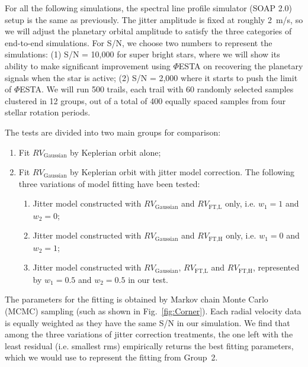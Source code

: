 For all the following simulations, the spectral line profile simulator (SOAP 2.0) setup is the same as previously. The jitter amplitude is fixed at roughly 2~m/s, so we will adjust the planetary orbital amplitude to satisfy the three categories of end-to-end simulations. For S/N, we choose two numbers to represent the simulations: (1) S/N = 10,000 for super bright stars, where we will show its ability to make significant improvement using $\mathit{\Phi}$ESTA on recovering the planetary signals when the star is active; (2) S/N = 2,000 where it starts to push the limit of $\mathit{\Phi}$ESTA. We will run 500 trails, each trail with 60 randomly selected samples clustered in 12 groups, out of a total of 400 equally spaced samples from four stellar rotation periods. 

The tests are divided into two main groups for comparison:
\begin{enumerate}
	\item Fit $RV_\text{Gaussian}$ by Keplerian orbit alone;
	\item Fit $RV_\text{Gaussian}$ by Keplerian orbit with jitter model correction. The following three variations of model fitting have been tested:
   \begin{enumerate}
     \item Jitter model constructed with $RV_\text{Gaussian}$ and $RV_\text{FT,L}$ only, i.e. $w_1=1$ and $w_2=0$;
     \item Jitter model constructed with $RV_\text{Gaussian}$ and $RV_\text{FT,H}$ only, i.e. $w_1=0$ and $w_2=1$;
     \item Jitter model constructed with $RV_\text{Gaussian}$, $RV_\text{FT,L}$ and $RV_\text{FT,H}$, represented by $w_1=0.5$ and $w_2=0.5$ in our test. 
   \end{enumerate}
\end{enumerate}
The parameters for the fitting is obtained by Markov chain Monte Carlo (MCMC) sampling (such as shown in Fig.~\ref{fig:Corner}). Each radial velocity data is equally weighted as they have the same S/N in our simulation. We find that among the three variations of jitter correction treatments, the one left with the least residual (i.e. smallest rms) empirically returns the best fitting parameters, which we would use to represent the fitting from Group~2. 

